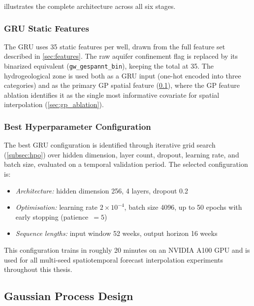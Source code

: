  illustrates the complete architecture across all six stages.

\subsubsection{GRU Static Features}
\label{sec:gru_static_features}

The GRU uses 35 static features per well, drawn from the full feature set described in
\cref{sec:features}. The raw aquifer confinement flag is replaced by its binarized equivalent (\texttt{gw\_gespannt\_bin}), keeping the total at 35.
The hydrogeological zone is used both as a GRU input (one-hot encoded into three categories) and
as the primary GP spatial feature (\cref{sec:gp_design}), where the GP feature ablation
identifies it as the single most informative covariate for spatial interpolation
(\cref{sec:gp_ablation}).

\subsubsection{Best Hyperparameter Configuration}

The best GRU configuration is identified through iterative grid search (\cref{subsec:hpo}) over hidden dimension, layer count,
dropout, learning rate, and batch size, evaluated on a temporal validation period.
The selected configuration is:

\begin{itemize}
  \item \textit{Architecture:} hidden dimension 256, 4 layers, dropout 0.2
  \item \textit{Optimisation:} learning rate $2 \times 10^{-4}$, batch size 4096, up to 50 epochs with early stopping (patience~$= 5$)
  \item \textit{Sequence lengths:} input window 52 weeks, output horizon 16 weeks
\end{itemize}

This configuration trains in roughly 20 minutes on an NVIDIA A100 GPU and is used for
all multi-seed spatiotemporal forecast interpolation experiments throughout this thesis.

\subsection{Gaussian Process Design}
\label{sec:gp_design}

